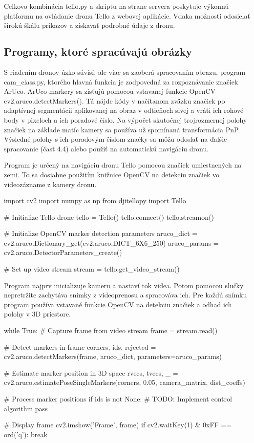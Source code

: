 Celkovo kombinácia tello.py a skriptu na strane servera poskytuje výkonnú platformu na ovládanie dronu Tello z webovej aplikácie. Vďaka možnosti odosielať širokú škálu príkazov a získavať podrobné údaje z dronu.

\subsection{Programy, ktoré spracúvajú obrázky}
S riadením dronov úzko súvisí, ale viac sa zaoberá spracovaním obrazu, program cam\_class.py, ktorého hlavná funkcia je zodpovedná za rozpoznávanie značiek ArUco. ArUco markery sa zisťujú pomocou vstavanej funkcie OpenCV cv2.aruco.detectMarkers(). Tá nájde kódy v načítanom zväzku značiek po adaptívnej segmentácii aplikovanej na obraz v odtieňoch sivej a vráti ich rohové body v pixeloch a ich poradové číslo. Na výpočet skutočnej trojrozmernej polohy značiek na základe matíc kamery sa používa už spomínaná transformácia PnP. Výsledné polohy s ich poradovým číslom značky sa môžu odoslať na ďalšie spracovanie (časť 4.4) alebo použiť na automatickú navigáciu dronu.

Program je určený na navigáciu dronu Tello pomocou značiek umiestnených na zemi. To sa dosiahne použitím knižnice OpenCV na detekciu značiek vo videozázname z kamery dronu.
\begin{mypython}[caption={Inicializácia parametrov detekcie značiek OpenCV},label=CL-3]

    import cv2
    import numpy as np
    from djitellopy import Tello
    
    # Initialize Tello drone
    tello = Tello()
    tello.connect()
    tello.streamon()
    
    # Initialize OpenCV marker detection parameters
    aruco_dict = cv2.aruco.Dictionary_get(cv2.aruco.DICT_6X6_250)
    aruco_params = cv2.aruco.DetectorParameters_create()
    
    # Set up video stream
    stream = tello.get_video_stream()
\end{mypython}

Program najprv inicializuje kameru a nastaví tok videa. Potom pomocou slučky nepretržite zachytáva snímky z videoprenosu a spracováva ich. Pre každú snímku program používa vstavané funkcie OpenCV na detekciu značiek a odhad ich polohy v 3D priestore.
\begin{mypython}[caption={Detekcia markera a vypočítanie polohy},label=CL-4]
    while True:
    # Capture frame from video stream
    frame = stream.read()

    # Detect markers in frame
    corners, ids, rejected = cv2.aruco.detectMarkers(frame, aruco_dict, parameters=aruco_params)

    # Estimate marker position in 3D space
    rvecs, tvecs, _ = cv2.aruco.estimatePoseSingleMarkers(corners, 0.05, camera_matrix, dist_coeffs)

    # Process marker positions
    if ids is not None:
        # TODO: Implement control algorithm
        pass

    # Display frame
    cv2.imshow('Frame', frame)
    if cv2.waitKey(1) & 0xFF == ord('q'):
        break

\end{mypython}

